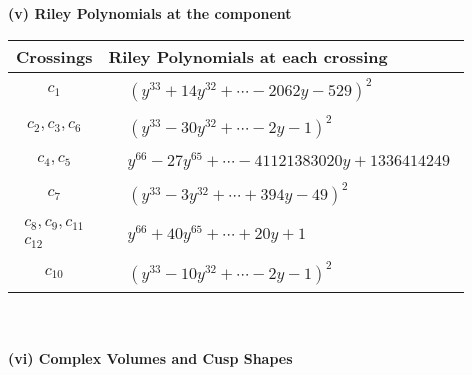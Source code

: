 \documentclass[1p]{elsarticle_modified}
\theoremstyle{definition}
\begin{document}
\newpage\renewcommand{\arraystretch}{1}
\flushleft \textbf{(v) Riley Polynomials at the component}\newline \\
\begin{tabular}{m{50pt}|m{274pt}}
Crossings & \hspace{64pt}Riley Polynomials at each crossing \\
\hline $$\begin{aligned}c_{1}\end{aligned}$$&$\begin{aligned}
&(y^{33}+14 y^{32}+\cdots-2062 y-529)^{2}
\end{aligned}$\\
\hline $$\begin{aligned}c_{2},c_{3},c_{6}\end{aligned}$$&$\begin{aligned}
&(y^{33}-30 y^{32}+\cdots-2 y-1)^{2}
\end{aligned}$\\
\hline $$\begin{aligned}c_{4},c_{5}\end{aligned}$$&$\begin{aligned}
&y^{66}-27 y^{65}+\cdots-41121383020 y+1336414249
\end{aligned}$\\
\hline $$\begin{aligned}c_{7}\end{aligned}$$&$\begin{aligned}
&(y^{33}-3 y^{32}+\cdots+394 y-49)^{2}
\end{aligned}$\\
\hline $$\begin{aligned}c_{8},c_{9},c_{11}\\c_{12}\end{aligned}$$&$\begin{aligned}
&y^{66}+40 y^{65}+\cdots+20 y+1
\end{aligned}$\\
\hline $$\begin{aligned}c_{10}\end{aligned}$$&$\begin{aligned}
&(y^{33}-10 y^{32}+\cdots-2 y-1)^{2}
\end{aligned}$\\
\hline
\end{tabular}\\~\\
\newpage\flushleft \textbf{(vi) Complex Volumes and Cusp Shapes}
\end{document}
